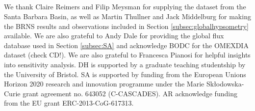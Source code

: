 \documentclass[gmd, manuscript]{copernicus}
\begin{document}
\subsection{}                               %




\begin{acknowledgements}
We thank Claire Reimers and Filip Meysman for supplying the dataset from the Santa Barbara Basin, as well as Martin Thullner and Jack Middelburg for making the BRNS results and observations 
included in Section \ref{subsec:globalhypsometry} available. We are also grateful to Andy Dale for providing the global flux database used in Section \ref{subsec:SA} and 
acknowledge BODC for the OMEXDIA dataset (check CD!).
We are also grateful to Francesca Pianosi for helpful insights into sensitivity analysis. 
DH is supported by a graduate teaching studentship by the University of Bristol. SA is supported by funding from
the European Unions Horizon 2020 research and innovation programme under the Marie Sk\l{}odowska-Curie grant agreement no.
643052 (C-CASCADES). AR acknowledge funding from the EU grant ERC-2013-CoG-617313.
\end{acknowledgements}




\newpage






\end{document}
